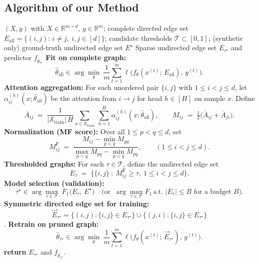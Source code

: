 \documentclass[10pt,a4paper]{article}
\begin{document}
\subsection{Algorithm of our Method}
\begin{algorithm}[h!]
\caption{Attention-Guided Feature–Interaction Graph Selection}\label{high-level-algor}
\begin{algorithmic}[1]
\Require $(X,y)$ with $X\in\mathbb{R}^{m\times d}$, $y\in\mathbb{R}^m$; complete directed edge set $E_{\mathrm{all}}=\{(i,j):\, i\neq j,\ i,j\in[d]\}$; candidate thresholds $\mathcal{T}\subset[0,1]$; (synthetic only) ground-truth undirected edge set $E^\star$
\Ensure Sparse undirected edge set $E_{\tau^\star}$ and predictor $f_{\hat\theta_{\tau^\star}}$
\State \textbf{Fit on complete graph:} 
\[
\hat\theta_{\mathrm{all}}\in\arg\min_{\theta}\ \frac{1}{m}\sum_{t=1}^{m}\ell\!\big(f_\theta(x^{(t)};\,E_{\mathrm{all}}),\,y^{(t)}\big).
\]
\vspace{-0.3em}
\State \textbf{Attention aggregation:} For each unordered pair $\{i,j\}$ with $1\le i<j\le d$, let $\alpha^{(h)}_{ij}(x;\hat\theta_{\mathrm{all}})$ be the attention from $i\!\to\! j$ for head $h\in[H]$ on sample $x$. Define
\[
\overline{A}_{ij}\;=\;\frac{1}{|\mathcal{S}_{\mathrm{train}}|\,H}\sum_{x\in\mathcal{S}_{\mathrm{train}}}\ \sum_{h=1}^{H}\alpha^{(h)}_{ij}(x;\hat\theta_{\mathrm{all}}),\qquad
M_{ij}\;=\;\tfrac{1}{2}\big(\overline{A}_{ij}+\overline{A}_{ji}\big).
\]
\vspace{-0.3em}
\State \textbf{Normalization (MF score):} Over all $1\le p<q\le d$, set
\[
M^{\mathrm{F}}_{ij}\;=\;\frac{M_{ij}-\min_{p<q}M_{pq}}{\max_{p<q}M_{pq}-\min_{p<q}M_{pq}},\qquad (1\le i<j\le d).
\]
\vspace{-0.3em}
\State \textbf{Thresholded graphs:} For each $\tau\in\mathcal{T}$, define the undirected edge set
\[
E_{\tau}\;=\;\big\{\{i,j\}\ :\ M^{\mathrm{F}}_{ij}\ge\tau,\ 1\le i<j\le d\big\}.
\]
\vspace{-0.3em}
\State \textbf{Model selection (validation):} 
\[
\tau^\star\in\arg\max_{\tau\in\mathcal{T}}\ F_1\!\big(E_{\tau},\,E^\star\big)
\quad\text{(or }\ \arg\max_{\tau\in\mathcal{T}}F_1\ \text{s.t. }|E_{\tau}|\le B\text{ for a budget }B\text{)}.
\]
\vspace{-0.3em}
\State \textbf{Symmetric directed edge set for training:}\ 
$$\vec{E}_{\tau^\star}=\{(i,j):\{i,j\}\in E_{\tau^\star}\}\cup\{(j,i):\{i,j\}\in E_{\tau^\star}\}$$.
\vspace{-0.3em}
\State \textbf{Retrain on pruned graph:}
\[
\hat\theta_{\tau^\star}\in\arg\min_{\theta}\ \frac{1}{m}\sum_{t=1}^{m}\ell\!\big(f_\theta(x^{(t)};\,\vec{E}_{\tau^\star}),\,y^{(t)}\big).
\]
\vspace{-0.3em}
\State \textbf{return} $E_{\tau^\star}$ and $f_{\hat\theta_{\tau^\star}}$.
\end{algorithmic}
\end{algorithm}
\end{document}
